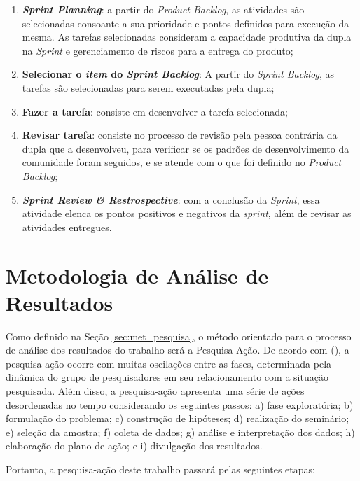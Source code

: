 \begin{enumerate}
    \item \textbf{\textit{Sprint Planning}}: a partir do \textit{Product Backlog}, as atividades são selecionadas consoante a sua prioridade e pontos definidos para execução da mesma. As tarefas selecionadas consideram a capacidade produtiva da dupla na \textit{Sprint} e gerenciamento de riscos para a entrega do produto;
    \item \textbf{Selecionar o \textit{item} do \textit{Sprint Backlog}}: A partir do \textit{Sprint Backlog}, as tarefas são selecionadas para serem executadas pela dupla;
    \item \textbf{Fazer a tarefa}: consiste em desenvolver a tarefa selecionada;
    \item \textbf{Revisar tarefa}: consiste no processo de revisão pela pessoa contrária da dupla que a desenvolveu, para verificar se os padrões de desenvolvimento da comunidade foram seguidos, e se atende com o que foi definido no \textit{Product Backlog};
    \item \textbf{\textit{Sprint Review \& Restrospective}}: com a conclusão da \textit{Sprint}, essa atividade elenca os pontos positivos e negativos da \textit{sprint}, além de revisar as atividades entregues.
\end{enumerate}


\section{Metodologia de Análise de Resultados}

Como definido na Seção \ref{sec:met_pesquisa}, o método orientado para o processo de análise dos resultados do trabalho será a Pesquisa-Ação. De acordo com  (\citeyear{gil2002elaborar}), a pesquisa-ação ocorre com muitas oscilações entre as fases, determinada pela dinâmica do grupo de pesquisadores em seu relacionamento com a situação pesquisada. Além disso, a pesquisa-ação apresenta uma série de ações desordenadas no tempo considerando os seguintes passos: a) fase exploratória; b) formulação do problema; c) construção de hipóteses; d) realização do seminário; e) seleção da amostra; f) coleta de dados; g) análise e interpretação dos dados; h) elaboração do plano de ação; e i) divulgação dos resultados.

Portanto, a pesquisa-ação deste trabalho passará pelas seguintes etapas:

